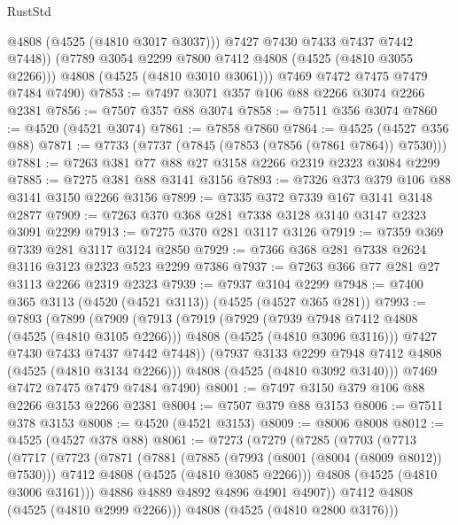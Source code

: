 \begin{lexlean}{RustStd}
\begin{coremodule}
              @4808
              (@4525 (@4810 @3017 @3037)))
            @7427
            @7430
            @7433
            @7437
            @7442
            @7448))
        (@7789 @3054 @2299 @7800 @7412 @4808 (@4525 (@4810 @3055 @2266)))
        @4808
        (@4525 (@4810 @3010 @3061)))
      @7469
      @7472
      @7475
      @7479
      @7484
      @7490)
@7853 := @7497 @3071 @357 @106 @88 @2266 @3074 @2266 @2381
@7856 := @7507 @357 @88 @3074
@7858 := @7511 @356 @3074
@7860 := @4520 (@4521 @3074)
@7861 := @7858 @7860
@7864 := @4525 (@4527 @356 @88)
@7871 := @7733 (@7737 (@7845 (@7853 (@7856 (@7861 @7864)) @7530)))
@7881 := @7263 @381 @77 @88 @27 @3158 @2266 @2319 @2323 @3084 @2299
@7885 := @7275 @381 @88 @3141 @3156
@7893 := @7326 @373 @379 @106 @88 @3141 @3150 @2266 @3156
@7899 := @7335 @372 @7339 @167 @3141 @3148 @2877
@7909 := @7263 @370 @368 @281 @7338 @3128 @3140 @3147 @2323 @3091 @2299
@7913 := @7275 @370 @281 @3117 @3126
@7919 := @7359 @369 @7339 @281 @3117 @3124 @2850
@7929 := @7366 @368 @281 @7338 @2624 @3116 @3123 @2323 @523 @2299 @7386
@7937 := @7263 @366 @77 @281 @27 @3113 @2266 @2319 @2323
@7939 := @7937 @3104 @2299
@7948 := @7400 @365 @3113 (@4520 (@4521 @3113)) (@4525 (@4527 @365 @281))
@7993 := @7893
    (@7899
      (@7909
        (@7913
          (@7919
            (@7929
              (@7939 @7948 @7412 @4808 (@4525 (@4810 @3105 @2266)))
              @4808
              (@4525 (@4810 @3096 @3116)))
            @7427
            @7430
            @7433
            @7437
            @7442
            @7448))
        (@7937 @3133 @2299 @7948 @7412 @4808 (@4525 (@4810 @3134 @2266)))
        @4808
        (@4525 (@4810 @3092 @3140)))
      @7469
      @7472
      @7475
      @7479
      @7484
      @7490)
@8001 := @7497 @3150 @379 @106 @88 @2266 @3153 @2266 @2381
@8004 := @7507 @379 @88 @3153
@8006 := @7511 @378 @3153
@8008 := @4520 (@4521 @3153)
@8009 := @8006 @8008
@8012 := @4525 (@4527 @378 @88)
@8061 := @7273
    (@7279
      (@7285
        (@7703
          (@7713
            (@7717
              (@7723
                (@7871
                  (@7881
                    (@7885 (@7993 (@8001 (@8004 (@8009 @8012)) @7530)))
                    @7412
                    @4808
                    (@4525 (@4810 @3085 @2266)))
                  @4808
                  (@4525 (@4810 @3006 @3161)))
                @4886
                @4889
                @4892
                @4896
                @4901
                @4907))
            @7412
            @4808
            (@4525 (@4810 @2999 @2266)))
          @4808
          (@4525 (@4810 @2800 @3176)))

\end{coremodule}
\end{lexlean}
